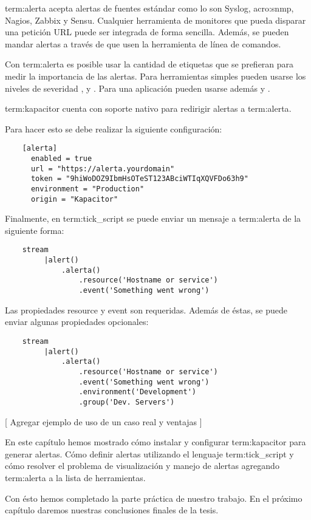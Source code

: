 \gls{term:alerta} acepta alertas de fuentes estándar como lo son Syslog,
\gls{acro:snmp}, Nagios, Zabbix y Sensu. Cualquier herramienta de monitores que
pueda disparar una petición URL puede ser integrada de forma sencilla. Además,
se pueden mandar alertas a través de  que usen la herramienta de línea
de comandos.

Con \gls{term:alerta} es posible usar la cantidad de etiquetas que se prefieran
para medir la importancia de las alertas. Para herramientas simples pueden
usarse los niveles de severidad ,  y . Para
una aplicación pueden usarse además  y .

\gls{term:kapacitor} cuenta con soporte nativo para redirigir alertas a
\gls{term:alerta}.

Para hacer esto se debe realizar la siguiente configuración:

\begin{lstlisting}
    [alerta]
      enabled = true
      url = "https://alerta.yourdomain"
      token = "9hiWoDOZ9IbmHsOTeST123ABciWTIqXQVFDo63h9"
      environment = "Production"
      origin = "Kapacitor"
\end{lstlisting}

Finalmente, en \gls{term:tick_script} se puede enviar un mensaje a
\gls{term:alerta} de la siguiente forma:

\begin{lstlisting}
    stream
         |alert()
             .alerta()
                 .resource('Hostname or service')
                 .event('Something went wrong')
\end{lstlisting}

Las propiedades resource y event son requeridas. Además de éstas, se puede
enviar algunas propiedades opcionales:

\begin{lstlisting}
    stream
         |alert()
             .alerta()
                 .resource('Hostname or service')
                 .event('Something went wrong')
                 .environment('Development')
                 .group('Dev. Servers')
\end{lstlisting}

[ Agregar ejemplo de uso de un caso real y ventajas ]

En este capítulo hemos mostrado cómo instalar y configurar \gls{term:kapacitor}
para generar alertas. Cómo definir alertas utilizando el lenguaje
\gls{term:tick_script} y cómo resolver el problema de visualización y manejo de
alertas agregando \gls{term:alerta} a la lista de herramientas.

Con ésto hemos completado la parte práctica de nuestro trabajo. En el próximo
capítulo daremos nuestras conclusiones finales de la tesis.
